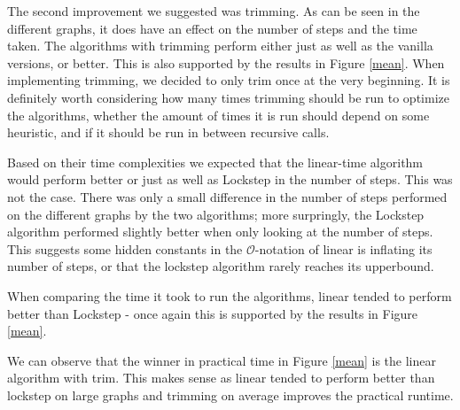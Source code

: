 \documentclass[../master/master.tex]{subfiles}
\begin{document}
The second improvement we suggested was trimming. As can be seen in the different graphs, it does have an effect on the number of steps and the time taken. The algorithms with trimming perform either just as well as the vanilla versions, or better. This is also supported by the results in Figure \ref{mean}. When implementing trimming, we decided to only trim once at the very beginning. It is definitely worth considering how many times trimming should be run to optimize the algorithms, whether the amount of times it is run should depend on some heuristic, and if it should be run in between recursive calls.

Based on their time complexities we expected that the linear-time algorithm would perform better or just as well as Lockstep in the number of steps. This was not the case. There was only a small difference in the number of steps performed on the different graphs by the two algorithms; more surpringly, the Lockstep algorithm performed slightly better when only looking at the number of steps. This suggests some hidden constants in the $\mathcal{O}$-notation of linear is inflating its number of steps, or that the lockstep algorithm rarely reaches its upperbound.

When comparing the time it took to run the algorithms, linear tended to perform better than Lockstep - once again this is supported by the results in Figure \ref{mean}.

We can observe that the winner in practical time in Figure \ref{mean} is the linear algorithm with trim. This makes sense as linear tended to perform better than lockstep on large graphs and trimming on average improves the practical runtime.
\end{document}
